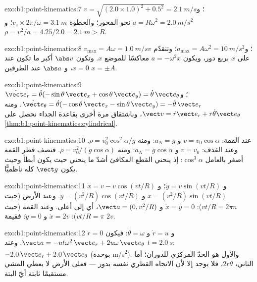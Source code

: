 \begin{solution}{exo:b1:point-kinematics:7}
$v = \sqrt{(2.0 \times 1.0)^2 + 0.5^2} = \qty{2.1}{m/s}$؛ و$a = R\omega^2 =
\qty{2.0}{m/s^2}$ نحو المحور؛ والخطوة $v_z \times 2\pi/\omega =
\qty{3.1}{m}$؛ و$\rho = v^2/a = 4.25/2.0 = \qty{2.1}{m} > R$.
\end{solution}

\begin{solution}{exo:b1:point-kinematics:8}
$v_{\max} = A\omega = \qty{1.0}{m/s}$؛ و$a_{\max} = A\omega^2 = \qty{10}{m/s^2}$؛
وتتقدّم $v$ على $x$ بربع دور، ويكون $a = -\omega^2x$ معاكسًا للموضع $x$.
وتكون $\abs v$ أكبر ما تكون عند $x = 0$، و $\abs a$ عند الطرفين $x = \pm A$.
\end{solution}

\begin{solution}{exo:b1:point-kinematics:9}
$\dot{\vect e}_r = \dot\theta(-\sin\theta\,\vect e_x + \cos\theta\,\vect e_y)
= \dot\theta\,\vect e_\theta$؛ و$\dot{\vect e}_\theta = \dot\theta(-\cos\theta\,
\vect e_x - \sin\theta\,\vect e_y) = -\dot\theta\,\vect e_r$. ومنه
$\vect v = \dot r\vect e_r + r\dot\theta\vect e_\theta$، وباشتقاق
مرة أخرى بقاعدة الجداء نحصل على 
\cref{thm:b1:point-kinematics:cylindrical}.
\end{solution}

\begin{solution}{exo:b1:point-kinematics:10}
عند القمة: $v = v_0\cos\alpha$ و $a_N = g$: ومنه $\rho = v_0^2\cos^2\alpha/g$.
وعند القذف: $v = v_0$ و $a_N = g\cos\alpha$: ومنه $\rho = v_0^2/(g\cos\alpha)$.
فنصف قطر القمة أصغر بالعامل $\cos^3\alpha$: إذ ينحني القطع المكافئ أشدّ ما ينحني
حيث يكون أبطأ وحيث يكون $\vect g$ كله ناظميًّا.
\end{solution}

\begin{solution}{exo:b1:point-kinematics:11}
$\dot x = v - v\cos(vt/R)$ و $\dot y = v\sin(vt/R)$؛ و$\ddot x = (v^2/R)
\sin(vt/R)$ و $\ddot y = (v^2/R)\cos(vt/R)$. وعند الأرض (حيث $vt/R = 2\pi n$):
$\dot x = \dot y = 0$ و $\vect a = (0, v^2/R)$، أي إلى أعلى. وعند القمة
(حيث $vt/R = \pi$): $\dot x = 2v$ و $\dot y = 0$: فقيمة  $2v$.
\end{solution}

\begin{solution}{exo:b1:point-kinematics:12}
$\ddot r = 0$ و $\dot r = u$ و $\dot\theta = \omega$: فيكون $\vect a = -ut\omega^2\,
\vect e_r + 2u\omega\,\vect e_\theta$. وعند $t = \qty{2.0}{s}$: $-2.0\,\vect e_r
+ 2.0\,\vect e_\theta$ (بوحدة \unit{m/s^2}). والأول هو الحدّ المركزي
للدوران؛ أما الثاني، $2\dot r\dot\theta$، فلا يوجد إلا لأن
الاتجاه القطري نفسه يدور --- فعلى الأرض لا يعطي المشي مستقيمًا
 ثابتة أيّ  البتة.
\end{solution}

